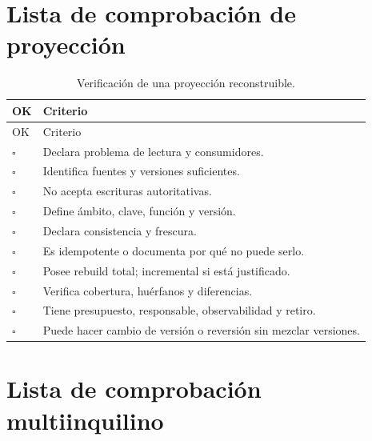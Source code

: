\section{Lista de comprobación de proyección}

\begin{longtable}{p{1cm}p{12.8cm}}
\caption{Verificación de una proyección reconstruible.}\label{tab:check-proyeccion}\\
\toprule
OK & Criterio \\
\midrule
\endfirsthead
\toprule
OK & Criterio \\
\midrule
\endhead
$\square$ & Declara problema de lectura y consumidores.\\
$\square$ & Identifica fuentes y versiones suficientes.\\
$\square$ & No acepta escrituras autoritativas.\\
$\square$ & Define ámbito, clave, función y versión.\\
$\square$ & Declara consistencia y frescura.\\
$\square$ & Es idempotente o documenta por qué no puede serlo.\\
$\square$ & Posee rebuild total; incremental si está justificado.\\
$\square$ & Verifica cobertura, huérfanos y diferencias.\\
$\square$ & Tiene presupuesto, responsable, observabilidad y retiro.\\
$\square$ & Puede hacer cambio de versión o reversión sin mezclar versiones.\\
\bottomrule
\end{longtable}

\section{Lista de comprobación multiinquilino}

